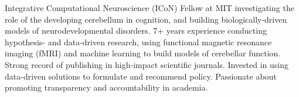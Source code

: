 

\begin{cvparagraph}

Integrative Computational Neuroscience (ICoN) Fellow at MIT investigating the role of the developing cerebellum in cognition, and building biologically-driven models of neurodevelopmental disorders. 7+ years experience conducting hypothesis- and data-driven research, using functional magnetic resonance imaging (fMRI) and machine learning to build models of cerebellar function. Strong record of publishing in high-impact scientific journals. Invested in using data-driven solutions to formulate and recommend policy. Passionate about promoting transparency and accountability in academia. 

\end{cvparagraph}
